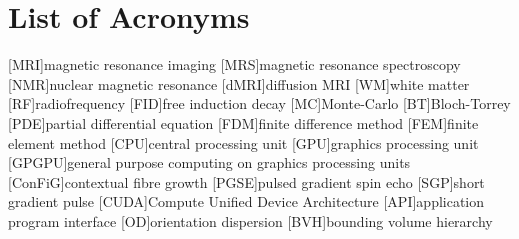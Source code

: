 \renewcommand{\BrainFuckChapter}{
{+}{+}{+}{+}{+}{+}{+}{+}{[}{>}{+}{+}{+}{+}{>}{+}{+}{+}{+}{+}{+}{>}{+}{+}{+}{+}{+}{+}{+}{+}{>}{+}{+}{+}{+}{+}{+}{+}{+}{+}{+}{>}{+}{+}{+}{+}{+}{+}{+}{+}{+}{+}{+}{+}{<}{<}{<}{<}{<}{-}{]}{>}{>}{>}{>}{-}{-}{-}{-}{.}
{>}{+}{+}{+}{+}{+}{+}{+}{+}{+}{.}{+}{+}{+}{+}{+}{+}{+}{+}{+}{+}{.}{+}{.}{<}{<}{<}{<}{.}{>}{>}{>}{>}{-}{-}{-}{-}{-}{.}{-}{-}{-}{-}{-}{-}{-}{-}{-}{.}{<}{<}{<}{<}{.}{>}{>}{+}{.}{>}{>}{-}{-}{-}{.}{+}{+}{+}{+}{+}{+}
{+}{+}{+}{+}{+}{+}{+}{+}{+}{.}{-}{-}{-}{.}{-}{.}{+}{+}{+}{+}{+}{+}{+}{+}{+}{+}{+}{.}{-}{-}{-}{-}{-}{-}{-}{-}{-}{-}{-}{-}{.}{+}{+}{+}{+}{+}{+}{.}{[}{>}{]}{<}{[}{[}{-}{]}{<}{]}{<}{-}{>}{-}{+}{-}{<}{-}{>}{-}{>}{+}
}
\chapter*{List of Acronyms}

\makeatletter
\patchcmd{\AC@@acro}{] #3}{] \MakeUppercase #3}{}{}
\patchcmd{\AC@@acro}{] #3}{] \MakeUppercase #3}{}{}
\makeatother
\begin{acronym}
  [MRI]{magnetic resonance imaging}
  [MRS]{magnetic resonance spectroscopy}
  [NMR]{nuclear magnetic resonance}
  [dMRI]{diffusion MRI}
  [WM]{white matter}
  [RF]{radiofrequency}
  [FID]{free induction decay}
  [MC]{Monte-Carlo}
  [BT]{Bloch-Torrey}
  [PDE]{partial differential equation}
  [FDM]{finite difference method}
  [FEM]{finite element method}
  [CPU]{central processing unit}
  [GPU]{graphics processing unit}
  [GPGPU]{general purpose computing on graphics processing units}
  [ConFiG]{contextual fibre growth}
  [PGSE]{pulsed gradient spin echo}
  [SGP]{short gradient pulse}
  [CUDA]{Compute Unified Device Architecture}
  [API]{application program interface}
  [OD]{orientation dispersion}
  [BVH]{bounding volume hierarchy}
\end{acronym}


